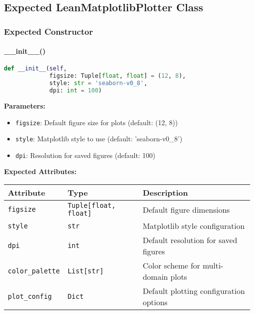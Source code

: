 \subsection{Expected LeanMatplotlibPlotter Class}
\label{subsec:lean_matplotlib_plotter_class}

\subsubsection{Expected Constructor}

\paragraph{\_\_init\_\_()}\leavevmode
\begin{lstlisting}[language=Python, caption=Expected Constructor Signature]
def __init__(self, 
             figsize: Tuple[float, float] = (12, 8),
             style: str = 'seaborn-v0_8',
             dpi: int = 100)
\end{lstlisting}

\textbf{Parameters:}
\begin{itemize}
    \item \texttt{figsize}: Default figure size for plots (default: (12, 8))
    \item \texttt{style}: Matplotlib style to use (default: 'seaborn-v0\_8')
    \item \texttt{dpi}: Resolution for saved figures (default: 100)
\end{itemize}

\textbf{Expected Attributes:}
\begin{longtable}{|p{3cm}|p{4cm}|p{7cm}|}
\hline
\textbf{Attribute} & \textbf{Type} & \textbf{Description} \\
\hline
\endhead

\texttt{figsize} & \texttt{Tuple[float, float]} & Default figure dimensions \\
\hline

\texttt{style} & \texttt{str} & Matplotlib style configuration \\
\hline

\texttt{dpi} & \texttt{int} & Default resolution for saved figures \\
\hline

\texttt{color\_palette} & \texttt{List[str]} & Color scheme for multi-domain plots \\
\hline

\texttt{plot\_config} & \texttt{Dict} & Default plotting configuration options \\
\hline

\end{longtable}

